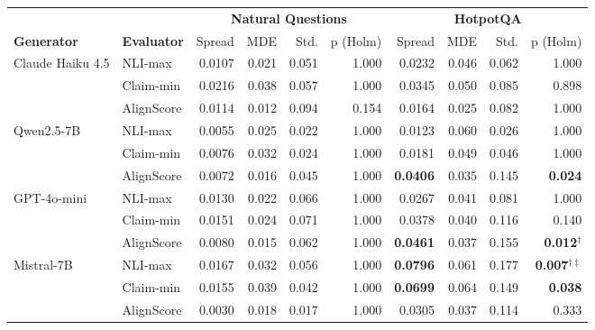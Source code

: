 \documentclass[11pt]{article}
\begin{document}
\begin{table}[t]
\centering
\small
\setlength{\tabcolsep}{4.5pt}
\begin{tabular}{llrrrrrrrr}
\toprule
 & & \multicolumn{4}{c}{\textbf{Natural Questions}} & \multicolumn{4}{c}{\textbf{HotpotQA}} \\
\cmidrule(lr){3-6}\cmidrule(lr){7-10}
\textbf{Generator} & \textbf{Evaluator} & Spread & MDE & Std. & p (Holm) & Spread & MDE & Std. & p (Holm) \\
\midrule
Claude Haiku 4.5 & NLI-max & 0.0107 & 0.021 & 0.051 & 1.000 & 0.0232 & 0.046 & 0.062 & 1.000 \\
 & Claim-min & 0.0216 & 0.038 & 0.057 & 1.000 & 0.0345 & 0.050 & 0.085 & 0.898 \\
 & AlignScore & 0.0114 & 0.012 & 0.094 & 0.154 & 0.0164 & 0.025 & 0.082 & 1.000 \\
\midrule
Qwen2.5-7B & NLI-max & 0.0055 & 0.025 & 0.022 & 1.000 & 0.0123 & 0.060 & 0.026 & 1.000 \\
 & Claim-min & 0.0076 & 0.032 & 0.024 & 1.000 & 0.0181 & 0.049 & 0.046 & 1.000 \\
 & AlignScore & 0.0072 & 0.016 & 0.045 & 1.000 & \textbf{0.0406} & 0.035 & 0.145 & \textbf{0.024} \\
\midrule
GPT-4o-mini & NLI-max & 0.0130 & 0.022 & 0.066 & 1.000 & 0.0267 & 0.041 & 0.081 & 1.000 \\
 & Claim-min & 0.0151 & 0.024 & 0.071 & 1.000 & 0.0378 & 0.040 & 0.116 & 0.140 \\
 & AlignScore & 0.0080 & 0.015 & 0.062 & 1.000 & \textbf{0.0461} & 0.037 & 0.155 & \textbf{0.012}$^{\dagger}$ \\
\midrule
Mistral-7B & NLI-max & 0.0167 & 0.032 & 0.056 & 1.000 & \textbf{0.0796} & 0.061 & 0.177 & \textbf{0.007}$^{\dagger\ddagger}$ \\
 & Claim-min & 0.0155 & 0.039 & 0.042 & 1.000 & \textbf{0.0699} & 0.064 & 0.149 & \textbf{0.038} \\
 & AlignScore & 0.0030 & 0.018 & 0.017 & 1.000 & 0.0305 & 0.037 & 0.114 & 0.333 \\
\bottomrule
\end{tabular}

\end{table}
\end{document}
